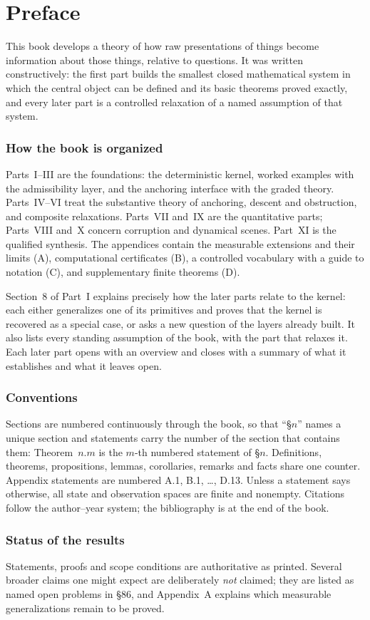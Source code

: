 \chapter*{Preface}
This book develops a theory of how raw presentations of things become information about those things, relative to questions. It was written constructively: the first part builds the smallest closed mathematical system in which the central object can be defined and its basic theorems proved exactly, and every later part is a controlled relaxation of a named assumption of that system.

\subsection*{How the book is organized}
Parts~I--III are the foundations: the deterministic kernel, worked examples with the admissibility layer, and the anchoring interface with the graded theory. Parts~IV--VI treat the substantive theory of anchoring, descent and obstruction, and composite relaxations. Parts~VII and~IX are the quantitative parts; Parts~VIII and~X concern corruption and dynamical scenes. Part~XI is the qualified synthesis. The appendices contain the measurable extensions and their limits (A), computational certificates (B), a controlled vocabulary with a guide to notation (C), and supplementary finite theorems (D).

Section~8 of Part~I explains precisely how the later parts relate to the kernel: each either generalizes one of its primitives and proves that the kernel is recovered as a special case, or asks a new question of the layers already built. It also lists every standing assumption of the book, with the part that relaxes it. Each later part opens with an overview and closes with a summary of what it establishes and what it leaves open.

\subsection*{Conventions}
Sections are numbered continuously through the book, so that ``\S$n$'' names a unique section and statements carry the number of the section that contains them: Theorem~$n.m$ is the $m$-th numbered statement of \S$n$. Definitions, theorems, propositions, lemmas, corollaries, remarks and facts share one counter. Appendix statements are numbered A.1, B.1, \dots, D.13. Unless a statement says otherwise, all state and observation spaces are finite and nonempty. Citations follow the author--year system; the bibliography is at the end of the book.

\subsection*{Status of the results}
Statements, proofs and scope conditions are authoritative as printed. Several broader claims one might expect are deliberately \emph{not} claimed; they are listed as named open problems in \S86, and Appendix~A explains which measurable generalizations remain to be proved.
\cleardoublepage

